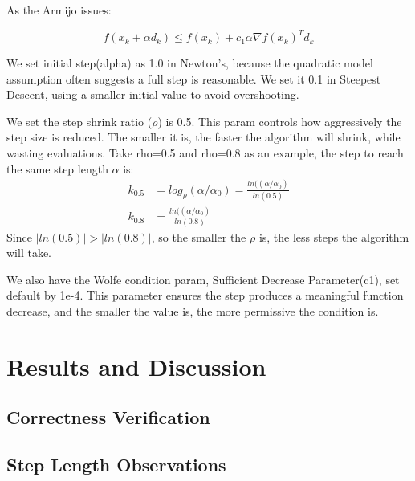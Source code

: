 \documentclass[12pt]{article}
\begin{document}
As the Armijo issues: 

\begin{equation}
f(x_k + \alpha d_k) \leq f(x_k) + c_1 \alpha \nabla f(x_k)^T d_k
\end{equation}

We set initial step(alpha) as 1.0 in Newton's, because the quadratic model assumption often suggests a full step is reasonable. We set it 0.1 in Steepest Descent, using a smaller initial value to avoid overshooting.

We set the step shrink ratio ($\rho$) is 0.5. This param controls how aggressively the step size is reduced. The smaller it is, the faster the algorithm will shrink, while wasting evaluations.  Take rho=0.5 and rho=0.8 as an example, the step to reach the same step length $\alpha$ is:
\begin{equation}
\begin{aligned}
k_{0.5}&=log_{\rho}(\alpha / \alpha_0) = \frac{ln((\alpha / \alpha_0)}{ln(0.5)} \\
k_{0.8}&=\frac{ln((\alpha / \alpha_0)}{ln(0.8)} 
\end{aligned}
\end{equation}
Since $|ln(0.5)| > |ln(0.8)|$, so the smaller the $\rho$ is, the less steps the algorithm will take. 

We also have the Wolfe condition param, Sufficient Decrease Parameter(c1), set default by 1e-4. This parameter ensures the step produces a meaningful function decrease, and the smaller the value is, the more permissive the condition is.


\section{Results and Discussion}

\subsection{Correctness Verification}

\subsection{Step Length Observations}
\end{document}
